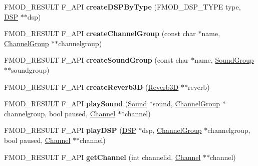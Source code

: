 \begin{DoxyCompactItemize}
\mbox{\label{classFMOD_1_1System_ab3a4c98eb70da7e96866b0f40f5cbd22}} 
F\+M\+O\+D\+\_\+\+R\+E\+S\+U\+LT F\+\_\+\+A\+PI {\bfseries create\+D\+S\+P\+By\+Type} (F\+M\+O\+D\+\_\+\+D\+S\+P\+\_\+\+T\+Y\+PE type, \hyperlink{classFMOD_1_1DSP}{D\+SP} $\ast$$\ast$dsp)
\item 
\mbox{\label{classFMOD_1_1System_af4d7063579a60c8986eb8bb1f67e7f2c}} 
F\+M\+O\+D\+\_\+\+R\+E\+S\+U\+LT F\+\_\+\+A\+PI {\bfseries create\+Channel\+Group} (const char $\ast$name, \hyperlink{classFMOD_1_1ChannelGroup}{Channel\+Group} $\ast$$\ast$channelgroup)
\item 
\mbox{\label{classFMOD_1_1System_adac6229aff0ac7480c50988d753df46f}} 
F\+M\+O\+D\+\_\+\+R\+E\+S\+U\+LT F\+\_\+\+A\+PI {\bfseries create\+Sound\+Group} (const char $\ast$name, \hyperlink{classFMOD_1_1SoundGroup}{Sound\+Group} $\ast$$\ast$soundgroup)
\item 
\mbox{\label{classFMOD_1_1System_aedd7913fc01f33f89a399295dc4b0ea4}} 
F\+M\+O\+D\+\_\+\+R\+E\+S\+U\+LT F\+\_\+\+A\+PI {\bfseries create\+Reverb3D} (\hyperlink{classFMOD_1_1Reverb3D}{Reverb3D} $\ast$$\ast$reverb)
\item 
\mbox{\label{classFMOD_1_1System_aa0eff9e71f48fd3710b5eba1a3b6d2b4}} 
F\+M\+O\+D\+\_\+\+R\+E\+S\+U\+LT F\+\_\+\+A\+PI {\bfseries play\+Sound} (\hyperlink{classFMOD_1_1Sound}{Sound} $\ast$sound, \hyperlink{classFMOD_1_1ChannelGroup}{Channel\+Group} $\ast$channelgroup, bool paused, \hyperlink{classFMOD_1_1Channel}{Channel} $\ast$$\ast$channel)
\item 
\mbox{\label{classFMOD_1_1System_a5a7f588f24305ff9cd888a191b9554a3}} 
F\+M\+O\+D\+\_\+\+R\+E\+S\+U\+LT F\+\_\+\+A\+PI {\bfseries play\+D\+SP} (\hyperlink{classFMOD_1_1DSP}{D\+SP} $\ast$dsp, \hyperlink{classFMOD_1_1ChannelGroup}{Channel\+Group} $\ast$channelgroup, bool paused, \hyperlink{classFMOD_1_1Channel}{Channel} $\ast$$\ast$channel)
\item 
\mbox{\label{classFMOD_1_1System_ada0bf180aafd95d6311fc6b743251299}} 
F\+M\+O\+D\+\_\+\+R\+E\+S\+U\+LT F\+\_\+\+A\+PI {\bfseries get\+Channel} (int channelid, \hyperlink{classFMOD_1_1Channel}{Channel} $\ast$$\ast$channel)
$$
\end{DoxyCompactItemize}
